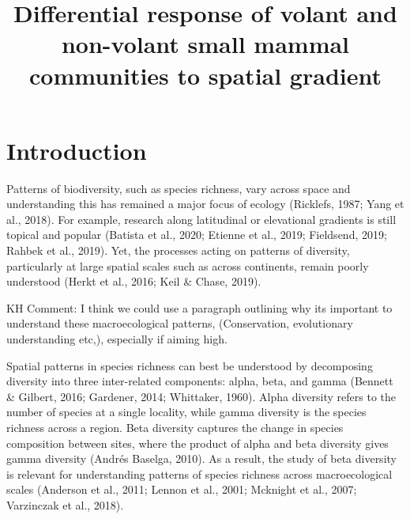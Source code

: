 \documentclass{article}
\begin{document}
\title{Differential response of volant and non-volant small mammal communities to spatial gradient}
\begin{titlepage}
\maketitle
\end{titlepage}






\section{Introduction}
Patterns of biodiversity, such as species richness, vary across space and understanding this has remained a major focus of ecology (Ricklefs, 1987; Yang et al., 2018). For example, research along latitudinal or elevational gradients is still topical and popular (Batista et al., 2020; Etienne et al., 2019; Fieldsend, 2019; Rahbek et al., 2019). Yet, the processes acting on patterns of diversity, particularly at large spatial scales such as across continents, remain poorly understood (Herkt et al., 2016; Keil \& Chase, 2019). 

\vspace{5mm}

KH Comment: I think we could use a paragraph outlining why its important to understand these macroecological patterns, (Conservation, evolutionary understanding etc,), especially if aiming high.

\vspace{5mm}


Spatial patterns in species richness can best be understood by decomposing diversity into three inter-related components: alpha, beta, and gamma (Bennett \& Gilbert, 2016; Gardener, 2014; Whittaker, 1960). Alpha diversity refers to the number of species at a single locality, while gamma diversity is the species richness across a region. Beta diversity captures the change in species composition between sites, where the product of alpha and beta diversity gives gamma diversity (Andrés Baselga, 2010). As a result, the study of beta diversity is relevant for understanding patterns of species richness across macroecological scales (Anderson et al., 2011; Lennon et al., 2001; Mcknight et al., 2007; Varzinczak et al., 2018). 
\end{document}
